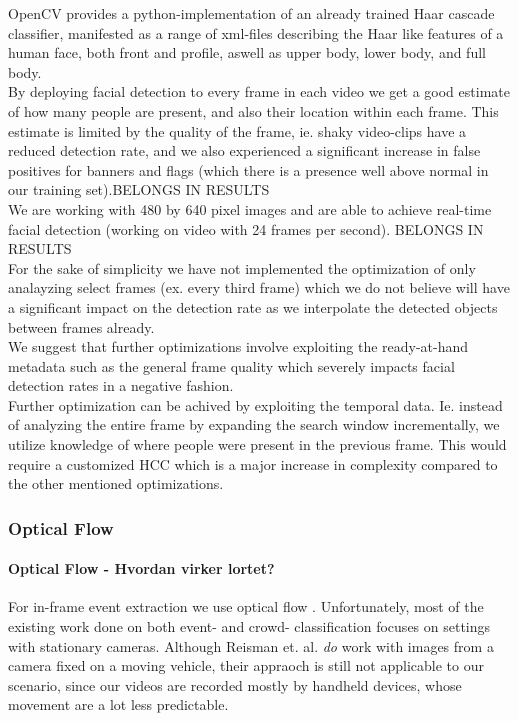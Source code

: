 %
OpenCV provides a python-implementation of an already trained Haar cascade classifier, manifested as a range of xml-files describing the Haar like features of a human face, both front and profile, aswell as upper body, lower body, and full body.\\
By deploying facial detection to every frame in each video we get a good estimate of how many people are present, and also their location within each frame. This estimate is limited by the quality of the frame, ie. shaky video-clips have a reduced detection rate, and we also experienced a significant increase in false positives for banners and flags (which there is a presence well above normal in our training set).BELONGS IN RESULTS\\
We are working with 480 by 640 pixel images and are able to achieve real-time facial detection (working on video with 24 frames per second). BELONGS IN RESULTS\\
For the sake of simplicity we have not implemented the optimization of only analayzing select frames (ex. every third frame) which we do not believe will have a significant impact on the detection rate as we interpolate the detected objects between frames already.\\
We suggest that further optimizations involve exploiting the ready-at-hand metadata such as the general frame quality which severely impacts facial detection rates in a negative fashion.\\
Further optimization can be achived by exploiting the temporal data. Ie. instead of analyzing the entire frame by expanding the search window incrementally, we utilize knowledge of where people were present in the previous frame. This would require a customized HCC which is a major increase in complexity compared to the other mentioned optimizations.
%
\subsubsection{Optical Flow}\label{sec:opticalflowdata}
%
\paragraph{Optical Flow - Hvordan virker lortet?}
%
For in-frame event extraction we use optical flow \cite{Bouguet2000}.
%
%
Unfortunately, most of the existing work done on both event- and crowd- classification focuses on settings with stationary cameras. Although Reisman et. al. \cite{CrowdDetectionInVideoSequences} \textit{do} work with images from a camera fixed on a moving vehicle, their appraoch is still not applicable to our scenario, since our videos are recorded mostly by handheld devices, whose movement are a lot less predictable.\\
%
